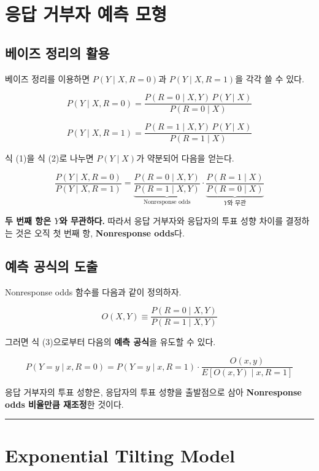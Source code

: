 \documentclass[
  letterpaper,
  DIV=11,
  numbers=noendperiod]{scrreprt}
\begin{document}
\section{응답 거부자 예측
모형}\label{uxc751uxb2f5-uxac70uxbd80uxc790-uxc608uxce21-uxbaa8uxd615}

\subsection{베이즈 정리의
활용}\label{uxbca0uxc774uxc988-uxc815uxb9acuxc758-uxd65cuxc6a9}

베이즈 정리를 이용하면 \(P(Y \mid X, R=0)\)과 \(P(Y \mid X, R=1)\)을
각각 쓸 수 있다.

\[P(Y \mid X, R=0) = \frac{P(R=0 \mid X,Y)\,P(Y \mid X)}{P(R=0 \mid X)} \tag{1}\]

\[P(Y \mid X, R=1) = \frac{P(R=1 \mid X,Y)\,P(Y \mid X)}{P(R=1 \mid X)} \tag{2}\]

식 (1)을 식 (2)로 나누면 \(P(Y \mid X)\)가 약분되어 다음을 얻는다.

\[\frac{P(Y \mid X, R=0)}{P(Y \mid X, R=1)} = \underbrace{\frac{P(R=0 \mid X,Y)}{P(R=1 \mid X,Y)}}_{\displaystyle\text{Nonresponse odds}} \cdot \underbrace{\frac{P(R=1 \mid X)}{P(R=0 \mid X)}}_{\displaystyle Y\text{와 무관}} \tag{3}\]

\textbf{두 번째 항은 \(Y\)와 무관하다.} 따라서 응답 거부자와 응답자의
투표 성향 차이를 결정하는 것은 오직 첫 번째 항, \textbf{Nonresponse
odds}다.

\subsection{예측 공식의
도출}\label{uxc608uxce21-uxacf5uxc2dduxc758-uxb3c4uxcd9c}

Nonresponse odds 함수를 다음과 같이 정의하자.

\[O(X, Y) \equiv \frac{P(R=0 \mid X,Y)}{P(R=1 \mid X,Y)}\]

그러면 식 (3)으로부터 다음의 \textbf{예측 공식}을 유도할 수 있다.

\[P(Y=y \mid x, R=0) = P(Y=y \mid x, R=1) \cdot \frac{O(x,y)}{E[O(x,Y) \mid x, R=1]} \tag{4}\]

응답 거부자의 투표 성향은, 응답자의 투표 성향을 출발점으로 삼아
\textbf{Nonresponse odds 비율만큼 재조정}한 것이다.

\begin{center}\rule{0.5\linewidth}{0.5pt}\end{center}

\section{Exponential Tilting Model}\label{exponential-tilting-model}
\end{document}
